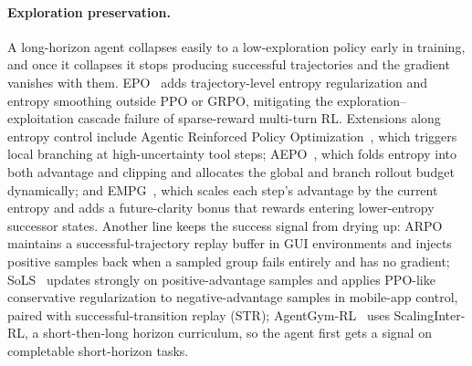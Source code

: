 \paragraph{Exploration preservation.} A long-horizon agent collapses easily to a low-exploration policy early in training, and once it collapses it stops producing successful trajectories and the gradient vanishes with them. EPO~\cite{Xu25k} adds trajectory-level entropy regularization and entropy smoothing outside PPO or GRPO, mitigating the exploration--exploitation cascade failure of sparse-reward multi-turn RL. Extensions along entropy control include Agentic Reinforced Policy Optimization~\cite{Don25d}, which triggers local branching at high-uncertainty tool steps; AEPO~\cite{Don25c}, which folds entropy into both advantage and clipping and allocates the global and branch rollout budget dynamically; and EMPG~\cite{Wan25ad}, which scales each step's advantage by the current entropy and adds a future-clarity bonus that rewards entering lower-entropy successor states. Another line keeps the success signal from drying up: ARPO~\cite{Lu25f} maintains a successful-trajectory replay buffer in GUI environments and injects positive samples back when a sampled group fails entirely and has no gradient; SoLS~\cite{Pap25c} updates strongly on positive-advantage samples and applies PPO-like conservative regularization to negative-advantage samples in mobile-app control, paired with successful-transition replay (STR); AgentGym-RL~\cite{Xi25c} uses ScalingInter-RL, a short-then-long horizon curriculum, so the agent first gets a signal on completable short-horizon tasks.

